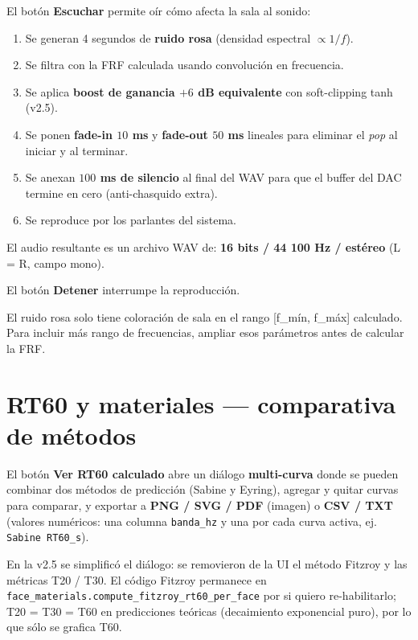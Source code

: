\documentclass[11pt, a4paper]{article}
\newenvironment{nota}[1][Nota]{%
  \begin{tcolorbox}[mybox=cBlue, title={#1}]%
}{\end{tcolorbox}}
\newcommand{\menu}[1]{\textbf{\guillemotleft #1\guillemotright}}
\begin{document}
El botón \textbf{Escuchar} permite oír cómo afecta la sala al sonido:

\begin{enumerate}[itemsep=3pt]
  \item Se generan 4 segundos de \textbf{ruido rosa} (densidad espectral
        $\propto 1/f$).
  \item Se filtra con la FRF calculada usando convolución en frecuencia.
  \item Se aplica \textbf{boost de ganancia $+6$ dB equivalente} con
        soft-clipping tanh (v2.5).
  \item Se ponen \textbf{fade-in $10$ ms} y \textbf{fade-out $50$ ms}
        lineales para eliminar el \emph{pop} al iniciar y al terminar.
  \item Se anexan \textbf{$100$ ms de silencio} al final del WAV para que
        el buffer del DAC termine en cero (anti-chasquido extra).
  \item Se reproduce por los parlantes del sistema.
\end{enumerate}

El audio resultante es un archivo WAV de:
\textbf{16 bits / 44 100 Hz / estéreo} (L = R, campo mono).

El botón \menu{Detener} interrumpe la reproducción.

\begin{nota}
  El ruido rosa solo tiene coloración de sala en el rango [f\_mín, f\_máx]
  calculado. Para incluir más rango de frecuencias, ampliar esos parámetros
  antes de calcular la FRF.
\end{nota}

\section{RT60 y materiales --- comparativa de métodos}

El botón \menu{Ver RT60 calculado} abre un diálogo \textbf{multi-curva}
donde se pueden combinar dos métodos de predicción (Sabine y Eyring),
agregar y quitar curvas para comparar, y exportar a
\textbf{PNG / SVG / PDF} (imagen) o \textbf{CSV / TXT} (valores numéricos:
una columna \texttt{banda\_hz} y una por cada curva activa, ej.
\texttt{Sabine RT60\_s}).

\begin{nota}
En la v2.5 se simplificó el diálogo: se removieron de la UI el método
Fitzroy y las métricas T20 / T30. El código Fitzroy permanece en
\texttt{face\_materials.compute\_fitzroy\_rt60\_per\_face} por si
quiero re-habilitarlo; T20 = T30 = T60 en predicciones teóricas
(decaimiento exponencial puro), por lo que sólo se grafica T60.
\end{nota}
\end{document}
